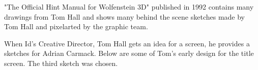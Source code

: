 \documentclass[book.tex]{subfiles}
\begin{document}
\begin{minipage}{0.7\textwidth}
"The Official Hint Manual for Wolfenstein 3D" published in 1992 contains many drawings from Tom Hall and shows many behind the scene sketches made by Tom Hall and pixelarted by the graphic team.\\
\par
 \begin{fancyquotes}
When Id's Creative Director, Tom Hall gets an idea for a screen, he provides a sketches for Adrian Carmack. Below are some of Tom's early design for the title screen. The third sketch was chosen.\\
\end{fancyquotes}
\end{minipage}
\begin{minipage}{0.3\textwidth}
\begin{flushright}
\end{flushright}
\end{minipage}

\noindent
   \begin{figure}[H]
\centering
 \end{figure}
 \par
   \begin{figure}[H]
\centering
\end{figure} 




\begin{figure}[H]
\centering    
   \end{figure}



     \begin{figure}[H]
\centering
   \end{figure}
 
  \begin{figure}[H]
\centering
 \\
 \end{figure}



     \begin{figure}[H]
\centering
   \end{figure}
\end{document}
